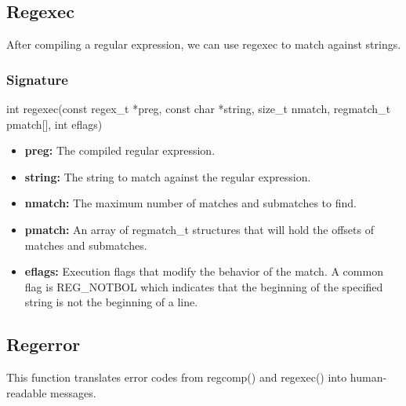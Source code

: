 \documentclass{report}
\begin{document}
    \bigbreak \noindent 
    \subsection{Regexec}
    \bigbreak \noindent 
    \begin{concept}
        After compiling a regular expression, we can use regexec to match against strings.
    \end{concept}
    \bigbreak \noindent 
    \subsubsection{Signature}
    \bigbreak \noindent 
    \begin{cppcode}
         int regexec(const regex\_t *preg, const char *string, size\_t nmatch, regmatch\_t pmatch[], int eflags)
    \end{cppcode}
    \bigbreak \noindent 
    \begin{itemize}
        \item \textbf{preg:} The compiled regular expression.
        \item \textbf{string:} The string to match against the regular expression.
        \item \textbf{nmatch:} The maximum number of matches and submatches to find.
        \item \textbf{pmatch:} An array of regmatch\_t structures that will hold the offsets of matches and submatches.
        \item \textbf{eflags:} Execution flags that modify the behavior of the match. A common flag is REG\_NOTBOL which indicates that the beginning of the specified string is not the beginning of a line.
    \end{itemize}

    \bigbreak \noindent 
    \subsection{Regerror}
    \bigbreak \noindent 
    \begin{concept}
        This function translates error codes from regcomp() and regexec() into human-readable messages.
    \end{concept}
    \bigbreak \noindent 
\end{document}
